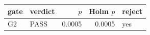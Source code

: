 \begin{tabular}{llrrl}
\toprule
gate & verdict & $p$ & Holm $p$ & reject \\
\midrule
G2 & PASS & 0.0005 & 0.0005 & yes \\
\bottomrule
\end{tabular}
